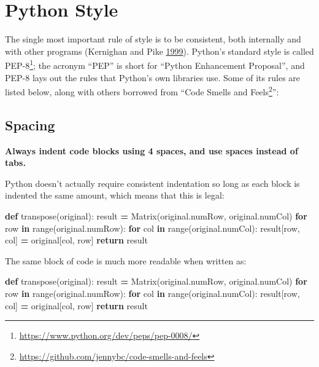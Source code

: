 \documentclass[
]{krantz}
\makeatletter
\newenvironment{Shaded}{\begin{snugshade}}{\end{snugshade}}
\newcommand{\BuiltInTok}[1]{#1}
\newcommand{\ControlFlowTok}[1]{\textcolor[rgb]{0.13,0.29,0.53}{\textbf{#1}}}
\newcommand{\KeywordTok}[1]{\textcolor[rgb]{0.13,0.29,0.53}{\textbf{#1}}}
\newcommand{\NormalTok}[1]{#1}
\newcommand{\OperatorTok}[1]{\textcolor[rgb]{0.81,0.36,0.00}{\textbf{#1}}}
\renewcommand{\href}[2]{#2\footnote{\url{#1}}}
\newenvironment{kframe}{%
\medskip{}
\setlength{\fboxsep}{.8em}
 \def\at@end@of@kframe{}%
 \ifinner\ifhmode%
  \def\at@end@of@kframe{\end{minipage}}%
  \begin{minipage}{\columnwidth}%
 \fi\fi%
 \def\FrameCommand##1{\hskip\@totalleftmargin \hskip-\fboxsep
 \colorbox{shadecolor}{##1}\hskip-\fboxsep
     \hskip-\linewidth \hskip-\@totalleftmargin \hskip\columnwidth}%
 \MakeFramed {\advance\hsize-\width
   \@totalleftmargin\z@ \linewidth\hsize
   \@setminipage}}%
 {\par\unskip\endMakeFramed%
 \at@end@of@kframe}
\renewenvironment{Shaded}{\begin{kframe}}{\end{kframe}}
\makeatother
\begin{document}
\hypertarget{style-pep8}{%
\section{Python Style}\label{style-pep8}}

The single most important rule of style is to be consistent,
both internally and with other programs (Kernighan and Pike \protect\hyperlink{ref-Kern1999}{1999}).
Python's standard style is called \href{https://www.python.org/dev/peps/pep-0008/}{PEP-8};
the acronym ``PEP'' is short for ``Python Enhancement Proposal'',
and PEP-8 lays out the rules that Python's own libraries use.
Some of its rules are listed below,
along with others borrowed from ``\href{https://github.com/jennybc/code-smells-and-feels}{Code Smells and Feels}'':

\hypertarget{spacing}{%
\subsection{Spacing}\label{spacing}}

\textbf{Always indent code blocks using 4 spaces, and use spaces instead of tabs.}

Python doesn't actually require consistent indentation
so long as each block is indented the same amount,
which means that this is legal:

\begin{Shaded}
\begin{Highlighting}[]
\KeywordTok{def}\NormalTok{ transpose(original):}
\NormalTok{  result }\OperatorTok{=}\NormalTok{ Matrix(original.numRow, original.numCol)}
  \ControlFlowTok{for}\NormalTok{ row }\KeywordTok{in} \BuiltInTok{range}\NormalTok{(original.numRow):}
              \ControlFlowTok{for}\NormalTok{ col }\KeywordTok{in} \BuiltInTok{range}\NormalTok{(original.numCol):}
\NormalTok{               result[row, col] }\OperatorTok{=}\NormalTok{ original[col, row]}
  \ControlFlowTok{return}\NormalTok{ result}
\end{Highlighting}
\end{Shaded}

The same block of code is much more readable when written as:

\begin{Shaded}
\begin{Highlighting}[]
\KeywordTok{def}\NormalTok{ transpose(original):}
\NormalTok{    result }\OperatorTok{=}\NormalTok{ Matrix(original.numRow, original.numCol)}
    \ControlFlowTok{for}\NormalTok{ row }\KeywordTok{in} \BuiltInTok{range}\NormalTok{(original.numRow):}
        \ControlFlowTok{for}\NormalTok{ col }\KeywordTok{in} \BuiltInTok{range}\NormalTok{(original.numCol):}
\NormalTok{            result[row, col] }\OperatorTok{=}\NormalTok{ original[col, row]}
    \ControlFlowTok{return}\NormalTok{ result}
\end{Highlighting}
\end{Shaded}
\end{document}
